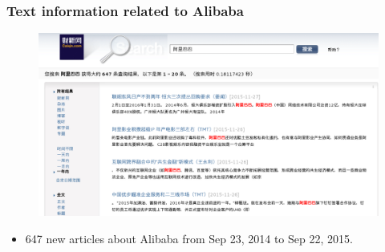 \documentclass{beamer}
\begin{document}
\begin{frame}
  \frametitle{Text information related to Alibaba}
  \begin{figure}
    \centering
    \includegraphics[height=0.7\textheight]{plot/Caixin.png}
  \end{figure}

  \begin{itemize}
  \item 647 new articles about Alibaba from Sep 23, 2014 to Sep 22, 2015.
  \end{itemize}
\end{frame}
\end{document}
